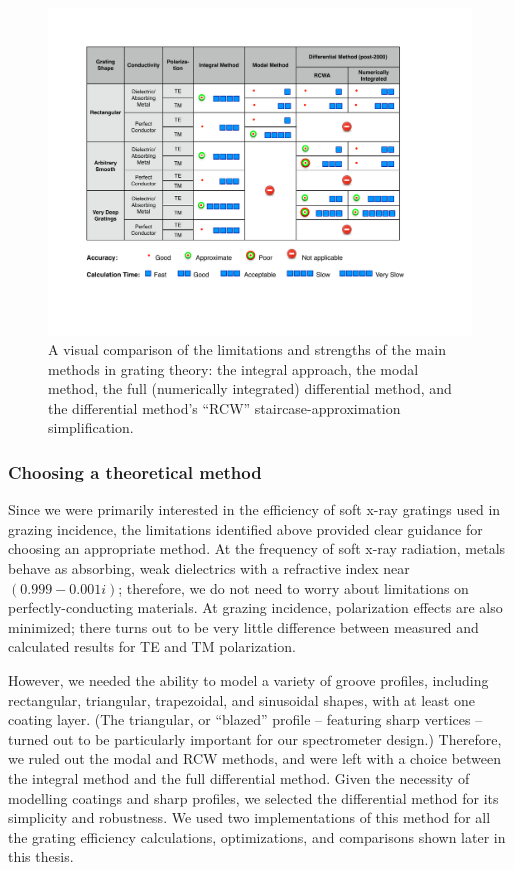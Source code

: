 \begin{figure}[htbp] %
   \centering
   \includegraphics[width=\bFigureWidth]{../data/Chapter2/2e_methodComparision/methodComparisonTable_noPre2000.pdf} 
   \caption[A visual comparison of the limitations and strengths of the main methods in grating theory.]{A visual comparison of the limitations and strengths of the main methods in grating theory: the integral approach, the modal method, the full (numerically integrated) differential method, and the differential method's ``RCW'' staircase-approximation simplification.}
   \label{2e}
\end{figure}
 

\subsubsection{Choosing a theoretical method}
Since we were primarily interested in the efficiency of soft x-ray gratings used in grazing incidence, the limitations identified above provided clear guidance for choosing an appropriate method.  At the frequency of soft x-ray radiation, metals behave as absorbing, weak dielectrics with a refractive index near $(0.999 - 0.001i)$; therefore, we do not need to worry about limitations on perfectly-conducting materials.  At grazing incidence, polarization effects are also minimized; there turns out to be very little difference between measured and calculated results for TE and TM polarization.

However, we needed the ability to model a variety of groove profiles, including rectangular, triangular, trapezoidal, and sinusoidal shapes, with at least one coating layer.  (The triangular, or ``blazed'' profile -- featuring sharp vertices -- turned out to be particularly important for our spectrometer design.)  Therefore, we ruled out the modal and RCW methods, and were left with a choice between the integral method and the full differential method.    Given the necessity of modelling coatings and sharp profiles, we selected the differential method for its simplicity and robustness.  We used two implementations of this method for all the grating efficiency calculations, optimizations, and comparisons shown later in this thesis.

